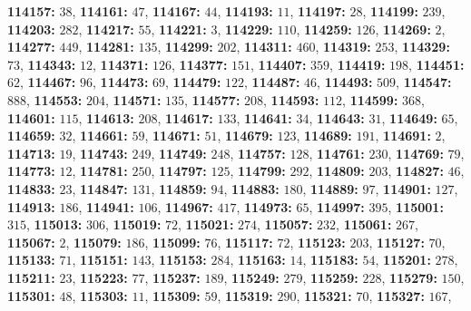 \textsf{\bfseries 114157:} $38$, \textsf{\bfseries 114161:} $47$, \textsf{\bfseries 114167:} $44$, \textsf{\bfseries 114193:} $11$, \textsf{\bfseries 114197:} $28$, \textsf{\bfseries 114199:} $239$, \textsf{\bfseries 114203:} $282$, \textsf{\bfseries 114217:} $55$, \textsf{\bfseries 114221:} $3$, \textsf{\bfseries 114229:} $110$, \textsf{\bfseries 114259:} $126$, \textsf{\bfseries 114269:} $2$, \textsf{\bfseries 114277:} $449$, \textsf{\bfseries 114281:} $135$, \textsf{\bfseries 114299:} $202$, \textsf{\bfseries 114311:} $460$, \textsf{\bfseries 114319:} $253$, \textsf{\bfseries 114329:} $73$, \textsf{\bfseries 114343:} $12$, \textsf{\bfseries 114371:} $126$, \textsf{\bfseries 114377:} $151$, \textsf{\bfseries 114407:} $359$, \textsf{\bfseries 114419:} $198$, \textsf{\bfseries 114451:} $62$, \textsf{\bfseries 114467:} $96$, \textsf{\bfseries 114473:} $69$, \textsf{\bfseries 114479:} $122$, \textsf{\bfseries 114487:} $46$, \textsf{\bfseries 114493:} $509$, \textsf{\bfseries 114547:} $888$, \textsf{\bfseries 114553:} $204$, \textsf{\bfseries 114571:} $135$, \textsf{\bfseries 114577:} $208$, \textsf{\bfseries 114593:} $112$, \textsf{\bfseries 114599:} $368$, \textsf{\bfseries 114601:} $115$, \textsf{\bfseries 114613:} $208$, \textsf{\bfseries 114617:} $133$, \textsf{\bfseries 114641:} $34$, \textsf{\bfseries 114643:} $31$, \textsf{\bfseries 114649:} $65$, \textsf{\bfseries 114659:} $32$, \textsf{\bfseries 114661:} $59$, \textsf{\bfseries 114671:} $51$, \textsf{\bfseries 114679:} $123$, \textsf{\bfseries 114689:} $191$, \textsf{\bfseries 114691:} $2$, \textsf{\bfseries 114713:} $19$, \textsf{\bfseries 114743:} $249$, \textsf{\bfseries 114749:} $248$, \textsf{\bfseries 114757:} $128$, \textsf{\bfseries 114761:} $230$, \textsf{\bfseries 114769:} $79$, \textsf{\bfseries 114773:} $12$, \textsf{\bfseries 114781:} $250$, \textsf{\bfseries 114797:} $125$, \textsf{\bfseries 114799:} $292$, \textsf{\bfseries 114809:} $203$, \textsf{\bfseries 114827:} $46$, \textsf{\bfseries 114833:} $23$, \textsf{\bfseries 114847:} $131$, \textsf{\bfseries 114859:} $94$, \textsf{\bfseries 114883:} $180$, \textsf{\bfseries 114889:} $97$, \textsf{\bfseries 114901:} $127$, \textsf{\bfseries 114913:} $186$, \textsf{\bfseries 114941:} $106$, \textsf{\bfseries 114967:} $417$, \textsf{\bfseries 114973:} $65$, \textsf{\bfseries 114997:} $395$, \textsf{\bfseries 115001:} $315$, \textsf{\bfseries 115013:} $306$, \textsf{\bfseries 115019:} $72$, \textsf{\bfseries 115021:} $274$, \textsf{\bfseries 115057:} $232$, \textsf{\bfseries 115061:} $267$, \textsf{\bfseries 115067:} $2$, \textsf{\bfseries 115079:} $186$, \textsf{\bfseries 115099:} $76$, \textsf{\bfseries 115117:} $72$, \textsf{\bfseries 115123:} $203$, \textsf{\bfseries 115127:} $70$, \textsf{\bfseries 115133:} $71$, \textsf{\bfseries 115151:} $143$, \textsf{\bfseries 115153:} $284$, \textsf{\bfseries 115163:} $14$, \textsf{\bfseries 115183:} $54$, \textsf{\bfseries 115201:} $278$, \textsf{\bfseries 115211:} $23$, \textsf{\bfseries 115223:} $77$, \textsf{\bfseries 115237:} $189$, \textsf{\bfseries 115249:} $279$, \textsf{\bfseries 115259:} $228$, \textsf{\bfseries 115279:} $150$, \textsf{\bfseries 115301:} $48$, \textsf{\bfseries 115303:} $11$, \textsf{\bfseries 115309:} $59$, \textsf{\bfseries 115319:} $290$, \textsf{\bfseries 115321:} $70$, \textsf{\bfseries 115327:} $167$, 
